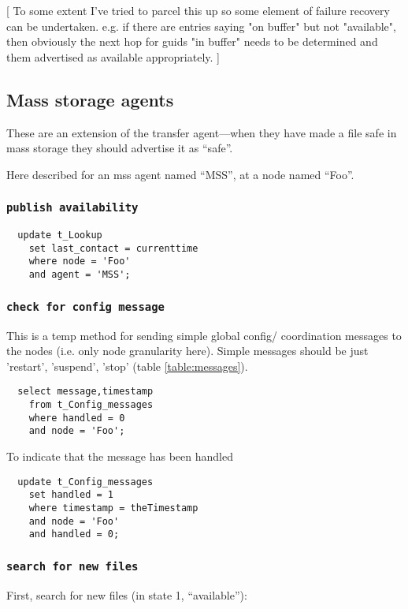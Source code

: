 \documentclass{cmspaper}
\begin{document}
[ To some extent I've tried to parcel this up so some element of failure recovery can be undertaken. e.g. if there are entries saying "on buffer" but not "available", then obviously the next hop for guids "in buffer" needs to be determined and them advertised as available appropriately. ]

\subsection{Mass storage agents}
These are an extension of the transfer agent---when they have made a
file safe in mass storage they should advertise it as ``safe''.

Here described for an mss agent named ``MSS'', at a node named ``Foo''.

\subsubsection{\textbf{\texttt{publish availability}}}

{\small\begin{verbatim}
  update t_Lookup
    set last_contact = currenttime
    where node = 'Foo'
    and agent = 'MSS';
\end{verbatim}}

\subsubsection{\textbf{\texttt{check for config message}}}
This is a temp method for sending simple global config/ coordination messages to the nodes (i.e. only node granularity here). Simple messages should be just 'restart', 'suspend', 'stop' (table \ref{table:messages}).

{\small\begin{verbatim}
  select message,timestamp
  	from t_Config_messages
  	where handled = 0
  	and node = 'Foo';
\end{verbatim}}

To indicate that the message has been handled

{\small\begin{verbatim}
  update t_Config_messages
  	set handled = 1
  	where timestamp = theTimestamp
  	and node = 'Foo'
  	and handled = 0;
\end{verbatim}}

\subsubsection{\textbf{\texttt{search for new files}}}
First, search for new files (in state 1, ``available''):
\end{document}
